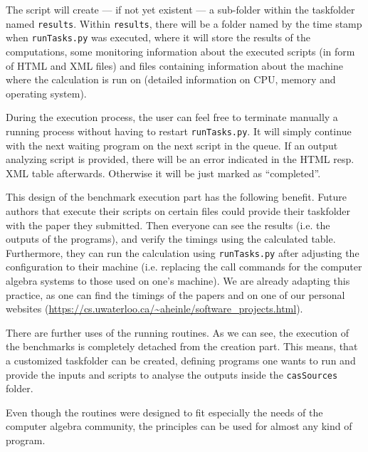 \documentclass[oribibl,11pt]{article}
\begin{document}
The script will create --- if not yet existent --- a sub-folder within
the taskfolder named \texttt{results}. Within \texttt{results}, there
will be a folder named by the time stamp when \texttt{runTasks.py} was
executed, where it will store the results of the computations, some
monitoring information about the executed scripts (in form of
\textsc{HTML} and \textsc{XML} files) and files containing information
about the machine where the calculation is run on (detailed information on CPU, memory and operating system).


During the execution process, the user can feel free to terminate
manually a running process without having to restart
\texttt{runTasks.py}. It will simply continue with the next waiting
program on the next script in the queue. If an output analyzing script
is provided, there will be an error indicated in the \textsc{HTML}
resp. \textsc{XML} table afterwards. Otherwise it will be just marked as ``completed''.

This design of the benchmark execution part has the following
benefit. Future authors that execute their scripts on certain files
could provide their taskfolder with the paper they submitted. Then
everyone can see the results (i.e. the outputs of the programs), and
verify the timings using the calculated table. Furthermore, they can
run the calculation using \texttt{runTasks.py} after adjusting the
configuration to their machine (i.e. replacing the call commands for
the computer algebra systems to those used on one's machine). We are already
adapting this practice, as one can find the timings of the papers
\cite{giesbrecht2014factoring} and \cite{heinle2013factorization} on
one of our personal websites (\url{https://cs.uwaterloo.ca/~aheinle/software_projects.html}).


There are further uses of the running routines. As we can see, the
execution of the benchmarks is completely detached from the
creation part. This means, that a customized taskfolder can be created,
defining programs one wants to run and provide the inputs and scripts
to analyse the outputs inside the
\texttt{casSources} folder.

Even though the routines were designed to fit especially the needs of
the computer algebra community, the principles can be used for almost
any kind of program.
\end{document}
